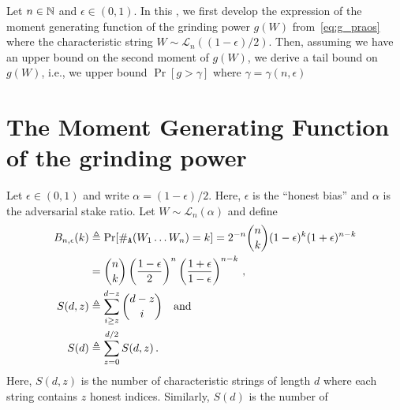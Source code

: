 

Let $n \in \mathbb{N}$ and $\epsilon \in (0,1)$.
In this \Section,
we first develop the expression of the moment generating function of the 
grinding power $g(W)$ from~\eqref{eq:g_praos}
where the characteristic string $W \sim \mathcal{L}_n((1-\epsilon)/2)$. 
Then, assuming we have an upper bound on the second moment of $g(W)$, 
we derive a tail bound on $g(W)$, 
i.e., we upper bound $\Pr[g > \gamma]$ where $\gamma = \gamma(n, \epsilon)$


\section{The Moment Generating Function of the grinding power}\label{sec:praos-gp-mgf}
Let $\epsilon \in (0, 1)$ and write $\alpha = (1 - \epsilon)/2$. 
Here, $\epsilon$ is the ``honest bias'' and $\alpha$ is the adversarial stake ratio.
Let $W \sim \mathcal{L}_n(\alpha)$ and 
define 
\begin{align}
    B_{n, \epsilon}(k) 
    &\triangleq \Pr[ \#_{\mathtt{A}}(W_1 \ldots W_n) = k ]  
    = 2^{-n}\binom{n}{k} (1-\epsilon)^k (1 + \epsilon)^{n-k} \nonumber\\
    &=  \binom{n}{k} 
        \left(\frac{1-\epsilon}{2}\right)^n 
        \left(\frac{1 + \epsilon}{1-\epsilon} \right)^{n-k} 
        \,, \label{eq:suffix-prob-binomial}\\
  S(d, z) 
    &\triangleq \sum_{i \geq z}^{d-z}{ \binom{d-z}{i} } \label{eq:S_d_z}
    \quad\text{and}\quad \\
  S(d) &\triangleq \sum_{z = 0}^{d/2} S(d,z) \label{eq:S_d}
  \,.
\end{align}
Here, $S(d,z)$ is the number of characteristic strings 
of length $d$ where each string contains $z$ honest indices. 
Similarly, $S(d)$ is the number of 



